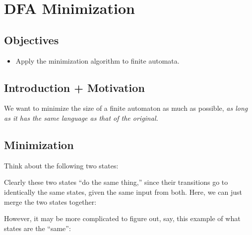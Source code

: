 \chapter{DFA Minimization}

\section{Objectives}

\begin{itemize}
	\item Apply the minimization algorithm to finite automata.
\end{itemize}

\section{Introduction + Motivation}

We want to minimize the size of a finite automaton as much as possible, \emph{as long as it has the same language as that of the original.}

\section{Minimization}

Think about the following two states:


Clearly these two states ``do the same thing,'' since their transitions go to identically the same states, given the same input from both.
Here, we can just merge the two states together:


However, it may be more complicated to  figure out, say, this example of what states are the ``same'':


